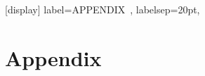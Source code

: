 \renewcommand{\appendixname}{APPENDIX}
\appendix
\sectionformat{\chapter}[display]{%
    label=\appendixname\ \thechapter,%
    labelsep=20pt,
}

\chapter{Appendix} \label{AppendixA}

